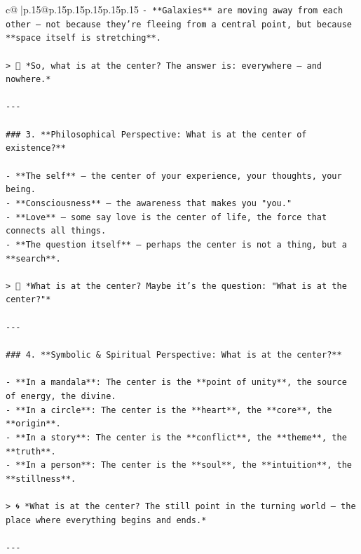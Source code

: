 \documentclass{article}
\begin{document}
{\begin{supertabular}{c@{$\;$}|p{.15\linewidth}@{}p{.15\linewidth}p{.15\linewidth}p{.15\linewidth}p{.15\linewidth}p{.15\linewidth}}
{{{\texttt{{-} **Galaxies** are moving away from each other — not because they’re fleeing from a central point, but because **space itself is stretching**.} \\
\\ 
\texttt{> 🌌 *So, what is at the center? The answer is: everywhere — and nowhere.*} \\
\\ 
\texttt{{-}{-}{-}} \\
\\ 
\texttt{\#\#\# 3. **Philosophical Perspective: What is at the center of existence?**} \\
\\ 
\texttt{{-} **The self** — the center of your experience, your thoughts, your being.} \\
\texttt{{-} **Consciousness** — the awareness that makes you "you."} \\
\texttt{{-} **Love** — some say love is the center of life, the force that connects all things.} \\
\texttt{{-} **The question itself** — perhaps the center is not a thing, but a **search**.} \\
\\ 
\texttt{> 🧠 *What is at the center? Maybe it’s the question: "What is at the center?"*} \\
\\ 
\texttt{{-}{-}{-}} \\
\\ 
\texttt{\#\#\# 4. **Symbolic \& Spiritual Perspective: What is at the center?**} \\
\\ 
\texttt{{-} **In a mandala**: The center is the **point of unity**, the source of energy, the divine.} \\
\texttt{{-} **In a circle**: The center is the **heart**, the **core**, the **origin**.} \\
\texttt{{-} **In a story**: The center is the **conflict**, the **theme**, the **truth**.} \\
\texttt{{-} **In a person**: The center is the **soul**, the **intuition**, the **stillness**.} \\
\\ 
\texttt{> 🌀 *What is at the center? The still point in the turning world — the place where everything begins and ends.*} \\
\\ 
\texttt{{-}{-}{-}} \\
\\ 
}}}
\end{supertabular}}
\end{document}
